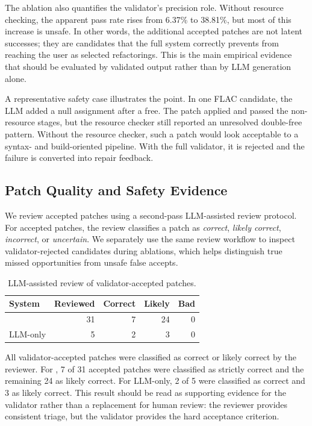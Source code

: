 The ablation also quantifies the validator's precision role. Without resource
checking, the apparent pass rate rises from 6.37\% to 38.81\%, but most of this
increase is unsafe. In other words, the additional accepted patches are not
latent successes; they are candidates that the full system correctly prevents
from reaching the user as selected refactorings. This is the main empirical
evidence that \SysName{} should be evaluated by validated output rather than by
LLM generation alone.

A representative safety case illustrates the point. In one FLAC candidate, the
LLM added a null assignment after a free. The patch applied and passed the
non-resource stages, but the resource checker still reported an unresolved
double-free pattern. Without the resource checker, such a patch would look
acceptable to a syntax- and build-oriented pipeline. With the full validator, it
is rejected and the failure is converted into repair feedback.

\subsection{Patch Quality and Safety Evidence}
\label{sec:evaluation-review}

We review accepted patches using a second-pass LLM-assisted review protocol.
For accepted patches, the review classifies a patch as
\emph{correct}, \emph{likely correct}, \emph{incorrect}, or \emph{uncertain}.
We separately use the same review workflow to inspect validator-rejected
candidates during ablations, which helps distinguish true missed opportunities
from unsafe false accepts.

\begin{table}[t]
  \centering
  \caption{LLM-assisted review of validator-accepted patches.}
  \label{tab:eval-review}
  \footnotesize
  \begin{tabular}{@{}lrrrr@{}}
    \toprule
    \textbf{System} & \textbf{Reviewed} & \textbf{Correct} & \textbf{Likely} & \textbf{Bad} \\
    \midrule
    \SysName{} & 31 & 7 & 24 & 0 \\
    LLM-only & 5 & 2 & 3 & 0 \\
    \bottomrule
  \end{tabular}
\end{table}

All validator-accepted patches were classified as correct or likely correct by
the reviewer. For \SysName{}, 7 of 31 accepted patches were classified as
strictly correct and the remaining 24 as likely correct. For LLM-only, 2 of 5
were classified as correct and 3 as likely correct. This result should be read
as supporting evidence for the validator rather than a replacement for human
review: the reviewer provides consistent triage, but the validator provides the
hard acceptance criterion.


